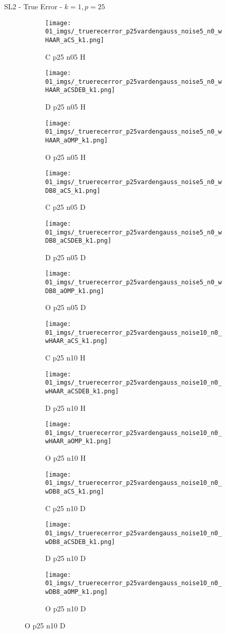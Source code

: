 \begin{frame}{SL2 - True Error - $k=1,p=25$}{}
\begin{figure}
\begin{subfigure}{0.13\textwidth}
\texttt{[image: 01\_imgs/\_truerecerror\_p25vardengauss\_noise5\_n0\_wHAAR\_aCS\_k1.png]}
\caption*{\tiny C p25 n05 H}
\end{subfigure}
\begin{subfigure}{0.13\textwidth}
\texttt{[image: 01\_imgs/\_truerecerror\_p25vardengauss\_noise5\_n0\_wHAAR\_aCSDEB\_k1.png]}
\caption*{\tiny D p25 n05 H}
\end{subfigure}
\begin{subfigure}{0.13\textwidth}
\texttt{[image: 01\_imgs/\_truerecerror\_p25vardengauss\_noise5\_n0\_wHAAR\_aOMP\_k1.png]}
\caption*{\tiny O p25 n05 H}
\end{subfigure}
\begin{subfigure}{0.13\textwidth}
\texttt{[image: 01\_imgs/\_truerecerror\_p25vardengauss\_noise5\_n0\_wDB8\_aCS\_k1.png]}
\caption*{\tiny C p25 n05 D}
\end{subfigure}
\begin{subfigure}{0.13\textwidth}
\texttt{[image: 01\_imgs/\_truerecerror\_p25vardengauss\_noise5\_n0\_wDB8\_aCSDEB\_k1.png]}
\caption*{\tiny D p25 n05 D}
\end{subfigure}
\begin{subfigure}{0.13\textwidth}
\texttt{[image: 01\_imgs/\_truerecerror\_p25vardengauss\_noise5\_n0\_wDB8\_aOMP\_k1.png]}
\caption*{\tiny O p25 n05 D}
\end{subfigure}

\vspace{5pt}

\begin{subfigure}{0.13\textwidth}
\texttt{[image: 01\_imgs/\_truerecerror\_p25vardengauss\_noise10\_n0\_wHAAR\_aCS\_k1.png]}
\caption*{\tiny C p25 n10 H}
\end{subfigure}
\begin{subfigure}{0.13\textwidth}
\texttt{[image: 01\_imgs/\_truerecerror\_p25vardengauss\_noise10\_n0\_wHAAR\_aCSDEB\_k1.png]}
\caption*{\tiny D p25 n10 H}
\end{subfigure}
\begin{subfigure}{0.13\textwidth}
\texttt{[image: 01\_imgs/\_truerecerror\_p25vardengauss\_noise10\_n0\_wHAAR\_aOMP\_k1.png]}
\caption*{\tiny O p25 n10 H}
\end{subfigure}
\begin{subfigure}{0.13\textwidth}
\texttt{[image: 01\_imgs/\_truerecerror\_p25vardengauss\_noise10\_n0\_wDB8\_aCS\_k1.png]}
\caption*{\tiny C p25 n10 D}
\end{subfigure}
\begin{subfigure}{0.13\textwidth}
\texttt{[image: 01\_imgs/\_truerecerror\_p25vardengauss\_noise10\_n0\_wDB8\_aCSDEB\_k1.png]}
\caption*{\tiny D p25 n10 D}
\end{subfigure}
\begin{subfigure}{0.13\textwidth}
\texttt{[image: 01\_imgs/\_truerecerror\_p25vardengauss\_noise10\_n0\_wDB8\_aOMP\_k1.png]}
\caption*{\tiny O p25 n10 D}
\end{subfigure}


\end{figure}
\end{frame}
